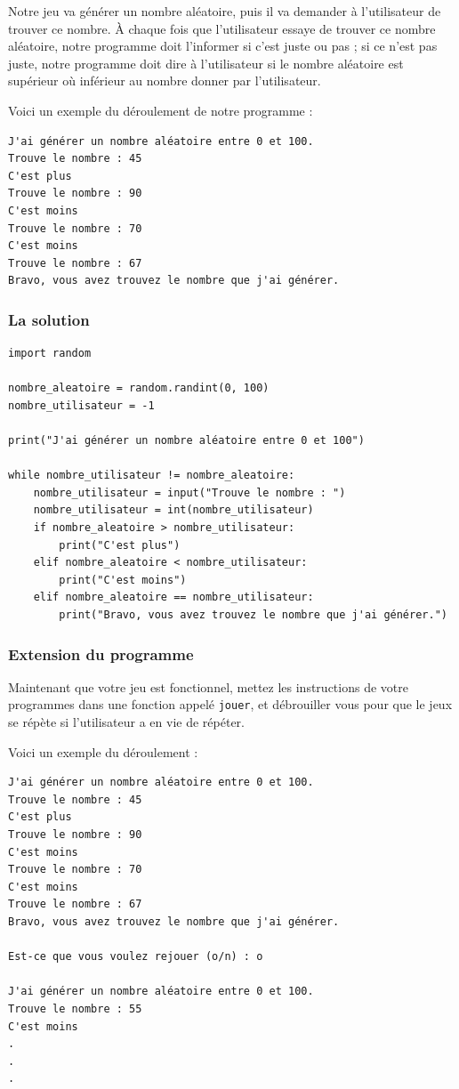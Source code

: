 \documentclass[12pt]{article}
\newcommand{\code}[1]{\colorbox{light-gray}{\texttt{#1}}}
\begin{document}
        Notre jeu va générer un nombre aléatoire, puis il va demander à l'utilisateur de trouver ce nombre. À chaque
        fois que l'utilisateur essaye de trouver ce nombre aléatoire, notre programme doit l'informer si c'est juste
        ou pas ; si ce n'est pas juste, notre programme doit dire à l'utilisateur si le nombre aléatoire est supérieur
        où inférieur au nombre donner par l'utilisateur.

        Voici un exemple du déroulement de notre programme :
        \begin{lstlisting}[style=exec_result]
J'ai générer un nombre aléatoire entre 0 et 100.
Trouve le nombre : 45
C'est plus
Trouve le nombre : 90
C'est moins
Trouve le nombre : 70
C'est moins
Trouve le nombre : 67
Bravo, vous avez trouvez le nombre que j'ai générer.
        \end{lstlisting}

        \subsubsection{La solution}

        \begin{lstlisting}[style=code, breaklines=false]
import random

nombre_aleatoire = random.randint(0, 100)
nombre_utilisateur = -1

print("J'ai générer un nombre aléatoire entre 0 et 100")

while nombre_utilisateur != nombre_aleatoire:
    nombre_utilisateur = input("Trouve le nombre : ")
    nombre_utilisateur = int(nombre_utilisateur)
    if nombre_aleatoire > nombre_utilisateur:
        print("C'est plus")
    elif nombre_aleatoire < nombre_utilisateur:
        print("C'est moins")
    elif nombre_aleatoire == nombre_utilisateur:
        print("Bravo, vous avez trouvez le nombre que j'ai générer.")
        \end{lstlisting}

        \subsubsection{Extension du programme}
            Maintenant que votre jeu est fonctionnel, mettez les instructions de votre programmes dans une fonction appelé
            \code{jouer}, et débrouiller vous pour que le jeux se répète si l'utilisateur a en vie de répéter.

            Voici un exemple du déroulement :
            \begin{lstlisting}[style=exec_result]
J'ai générer un nombre aléatoire entre 0 et 100.
Trouve le nombre : 45
C'est plus
Trouve le nombre : 90
C'est moins
Trouve le nombre : 70
C'est moins
Trouve le nombre : 67
Bravo, vous avez trouvez le nombre que j'ai générer.

Est-ce que vous voulez rejouer (o/n) : o

J'ai générer un nombre aléatoire entre 0 et 100.
Trouve le nombre : 55
C'est moins
.
.
.
        \end{lstlisting}
\end{document}
